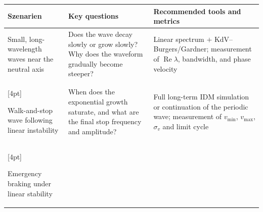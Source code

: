 \documentclass[11pt,a4paper,openany]{book}
\numberwithin{equation}{chapter}
\numberwithin{figure}{chapter}
\numberwithin{table}{chapter}
\begin{document}
\begin{center}
\small
{}
\label{tab:nonlinear-scenarios}
\begin{tabular}{p{3.5cm}p{4.7cm}p{5.5cm}}
\toprule
\textbf{Szenarien} & \textbf{Key questions} & \textbf{Recommended tools and metrics} \\
\midrule









Small, long-wavelength waves near the neutral axis






&






Does the wave decay slowly or grow slowly? Why does the waveform gradually become steeper?






&






Linear spectrum $+$ KdV–Burgers/Gardner; measurement of $\operatorname{Re}\lambda$, bandwidth, and phase velocity





\\

[4pt]

Walk-and-stop wave following linear instability






&






When does the exponential growth saturate, and what are the final stop frequency and amplitude?

&

Full long-term IDM simulation or continuation of the periodic wave; measurement of $v_{\min}$, $v_{\max}$, $\sigma_v$ and limit cycle





\\

[4pt]

Emergency braking under linear stability







\end{tabular}
\end{center}
\end{document}
